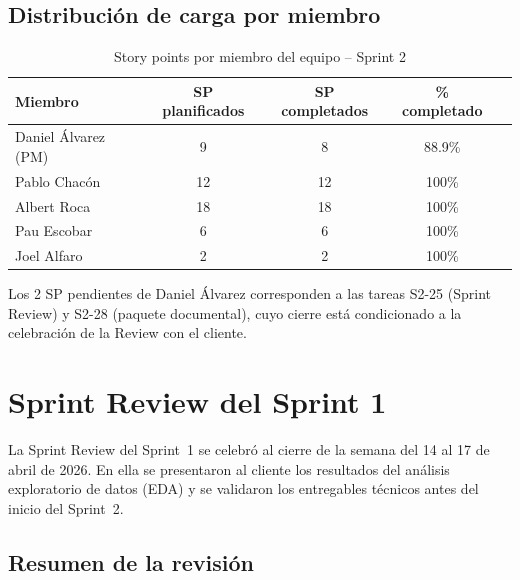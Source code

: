 \documentclass[12pt,a4paper]{article}
\begin{document}
\subsection{Distribución de carga por miembro}

\begin{table}[H]
\centering
\caption{Story points por miembro del equipo -- Sprint 2}
\label{tab:sp_miembro}
\renewcommand{\arraystretch}{1.3}
\begin{tabular}{lcccc}
\toprule
\textbf{Miembro} & \textbf{SP planificados} & \textbf{SP completados} & \textbf{\% completado} \\
\midrule
Daniel Álvarez (PM) & 9  & 8  & 88.9\% \\
Pablo Chacón        & 12 & 12 & 100\%  \\
Albert Roca         & 18 & 18 & 100\%  \\
Pau Escobar         & 6  & 6  & 100\%  \\
Joel Alfaro         & 2  & 2  & 100\%  \\
\bottomrule
\end{tabular}
\end{table}

Los 2 SP pendientes de Daniel Álvarez corresponden a las tareas S2-25 (Sprint Review) y S2-28 (paquete documental), cuyo cierre está condicionado a la celebración de la Review con el cliente.

\newpage
\section{Sprint Review del Sprint 1}

La Sprint Review del Sprint~1 se celebró al cierre de la semana del 14 al 17 de abril de 2026. En ella se presentaron al cliente los resultados del análisis exploratorio de datos (EDA) y se validaron los entregables técnicos antes del inicio del Sprint~2.

\subsection{Resumen de la revisión}
\end{document}
